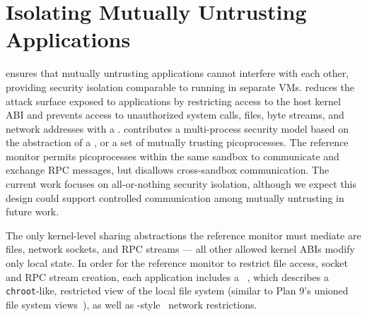 \section{Isolating Mutually Untrusting Applications}
\label{sec:graphene:security}

\sysname{} ensures that mutually untrusting applications 
cannot interfere with each other, providing security isolation
comparable to running in separate VMs.
\sysname{} reduces the attack surface exposed to applications
by restricting access to the host kernel ABI 
and prevents access to unauthorized system calls, files, byte streams,
and network addresses with a .
\sysname{} contributes a multi-process security model 
based on the abstraction of a ,
or a set of mutually trusting picoprocesses.
The reference monitor permits picoprocesses within the same sandbox
to communicate and exchange RPC messages, but disallows cross-sandbox communication.
The current work focuses on all-or-nothing security isolation, although we expect
this design could support
controlled communication among mutually untrusting \liboses{}
in future work.

The only kernel-level sharing abstractions the reference monitor must mediate
are files, network sockets, and RPC streams
--- all other allowed kernel ABIs
modify only local \picoproc{} state.
In order for the reference monitor to restrict file access, socket and RPC stream creation,
each application includes a ~\citep{hunt07rethink},
which describes a {\tt chroot}-like, restricted view of the local 
file system (similar to Plan 9's unioned file system views~\citep{pike90plan9}),
as well as -style~\citep{iptablesman} network restrictions.


